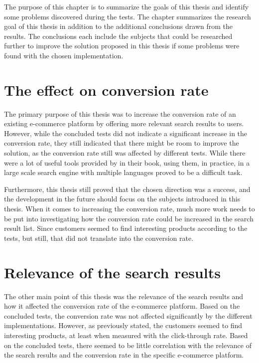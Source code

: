 


The purpose of this chapter is to summarize the goals of this thesis and identify some problems discovered
during the tests.
The chapter summarizes the research goal of this thesis in addition to the additional conclusions drawn
from the results.
The conclusions each include the subjects that could be researched further to improve the solution proposed in this thesis
if some problems were found with the chosen implementation.


\section{The effect on conversion rate}

The primary purpose of this thesis was to increase the conversion rate of an existing e-commerce platform by offering
more relevant search results to users. 
However, while the concluded tests did not indicate a significant increase in the conversion rate, they still
indicated that there might be room to improve the solution, as the conversion rate still was affected by different
tests.
While there were a lot of useful tools provided by \citeauthor{relevantSearch} \cite{relevantSearch} in their book, 
using them, in practice, in a large scale search engine with multiple languages proved to be a difficult task.

Furthermore, this thesis still proved that the chosen direction was a success, and the development in the future
should focus on the subjects introduced in this thesis.
When it comes to increasing the conversion rate, much more work needs to be put into investigating 
how the conversion rate could be increased in the search result list.
Since customers seemed to find interesting products according to the tests, but still, 
that did not translate into the conversion rate.


\section{Relevance of the search results}

The other main point of this thesis was the relevance of the search results and how it affected the conversion rate 
of the e-commerce platform.
Based on the concluded tests, the conversion rate was not affected significantly by the different implementations.
However, as previously stated, the customers seemed to find interesting products, at least when measured with the 
click-through rate. 
Based on the concluded tests, there seemed to be little correlation with the relevance of the search results
and the conversion rate in the specific e-commerce platform.

